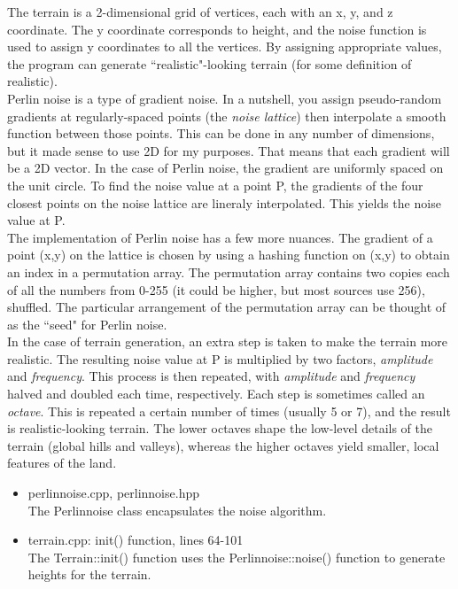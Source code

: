 \documentclass{article}
\begin{document}
	The terrain is a 2-dimensional grid of vertices, each with an x, y, and z coordinate. The y coordinate corresponds to height, and the noise function is used to assign y coordinates to all the vertices. By assigning appropriate values, the program can generate ``realistic"-looking terrain (for some definition of realistic).
	\\

	Perlin noise is a type of gradient noise. In a nutshell, you assign pseudo-random gradients at regularly-spaced points (the \textit{noise lattice}) then interpolate a smooth function between those points. This can be done in any number of dimensions, but it made sense to use 2D for my purposes. That means that each gradient will be a 2D vector. In the case of Perlin noise, the gradient are uniformly spaced on the unit circle. To find the noise value at a point P, the gradients of the four closest points on the noise lattice are lineraly interpolated. This yields the noise value at P.
	\\

	The implementation of Perlin noise has a few more nuances. The gradient of a point (x,y) on the lattice is chosen by using a hashing function on (x,y) to obtain an index in a permutation array. The permutation array contains two copies each of all the numbers from 0-255 (it could be higher, but most sources use 256), shuffled. The particular arrangement of the permutation array can be thought of as the ``seed" for Perlin noise.
	\\

	In the case of terrain generation, an extra step is taken to make the terrain more realistic. The  resulting noise value at P is multiplied by two factors, \textit{amplitude} and \textit{frequency}. This process is then repeated, with \textit{amplitude} and \textit{frequency} halved and doubled each time, respectively. Each step is sometimes called an \textit{octave}. This is repeated a certain number of times (usually 5 or 7), and the result is realistic-looking terrain. The lower octaves shape the low-level details of the terrain (global hills and valleys), whereas the higher octaves yield smaller, local features of the land.
	\\

	\begin{itemize}
	\item perlinnoise.cpp, perlinnoise.hpp \\
	The Perlinnoise class encapsulates the noise algorithm.
	\item terrain.cpp: init() function, lines 64-101 \\
	The Terrain::init() function uses the Perlinnoise::noise() function to generate heights for the terrain.
	\end{itemize}
\end{document}
